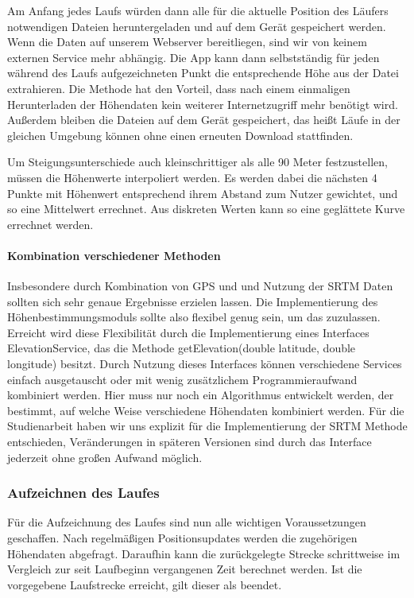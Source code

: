 Am Anfang jedes Laufs würden dann alle für die aktuelle Position des Läufers notwendigen Dateien heruntergeladen und auf dem Gerät gespeichert werden. Wenn die Daten auf unserem Webserver bereitliegen, sind wir von keinem externen Service mehr abhängig. Die App kann dann selbstständig für jeden während des Laufs aufgezeichneten Punkt die entsprechende Höhe aus der Datei extrahieren. Die Methode hat den Vorteil, dass nach einem einmaligen Herunterladen der Höhendaten kein weiterer Internetzugriff mehr benötigt wird. Außerdem bleiben die Dateien auf dem Gerät gespeichert, das heißt Läufe in der gleichen Umgebung können ohne einen erneuten Download stattfinden.

Um Steigungsunterschiede auch kleinschrittiger als alle 90 Meter festzustellen, müssen die Höhenwerte interpoliert werden. Es werden dabei die nächsten 4 Punkte mit Höhenwert entsprechend ihrem Abstand zum Nutzer gewichtet, und so eine Mittelwert errechnet. Aus diskreten Werten kann so eine geglättete Kurve errechnet werden.
\paragraph{Kombination verschiedener Methoden}
Insbesondere durch Kombination von GPS und und Nutzung der SRTM Daten sollten sich sehr genaue Ergebnisse erzielen lassen. Die Implementierung des Höhenbestimmungsmoduls sollte also flexibel genug sein, um das zuzulassen. Erreicht wird diese Flexibilität durch die Implementierung eines Interfaces ElevationService, das die Methode getElevation(double latitude, double longitude) besitzt. Durch Nutzung dieses Interfaces können verschiedene Services einfach ausgetauscht oder mit wenig zusätzlichem Programmieraufwand kombiniert werden. Hier muss nur noch ein Algorithmus entwickelt werden, der bestimmt, auf welche Weise verschiedene Höhendaten kombiniert werden. Für die Studienarbeit haben wir uns explizit für die Implementierung der SRTM Methode entschieden, Veränderungen in späteren Versionen sind durch das Interface jederzeit ohne großen Aufwand möglich.
\subsubsection{Aufzeichnen des Laufes}
Für die Aufzeichnung des Laufes sind nun alle wichtigen Voraussetzungen geschaffen. Nach regelmäßigen Positionsupdates werden die zugehörigen Höhendaten abgefragt. Daraufhin kann die zurückgelegte Strecke schrittweise im Vergleich zur seit Laufbeginn vergangenen Zeit berechnet werden. Ist die vorgegebene Laufstrecke erreicht, gilt dieser als beendet.

